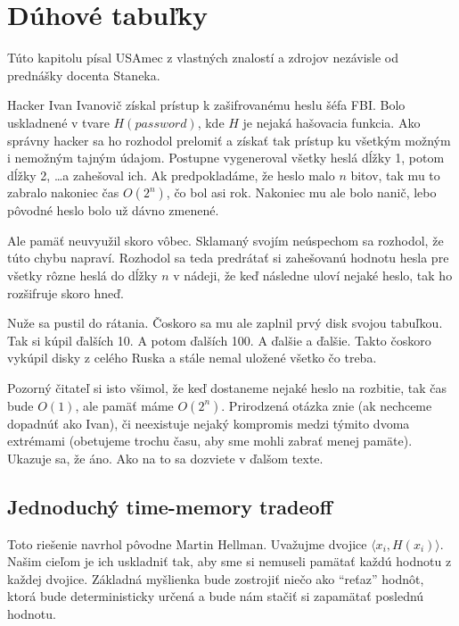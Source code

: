 \section{Dúhové tabuľky}

\begin{poznamka}
    Túto kapitolu písal USAmec z vlastných znalostí a zdrojov
    nezávisle od prednášky docenta Staneka.
\end{poznamka}

Hacker Ivan Ivanovič získal prístup k zašifrovanému heslu šéfa FBI.
Bolo uskladnené v tvare $H(password)$, kde $H$ je nejaká hašovacia funkcia.
Ako správny hacker sa ho rozhodol prelomiť a získať tak prístup
ku všetkým možným i nemožným tajným údajom.
Postupne vygeneroval všetky heslá dĺžky 1, potom dĺžky 2, \dots a
zahešoval ich.
Ak predpokladáme, že heslo malo $n$ bitov,
tak mu to zabralo nakoniec čas $O(2^n)$,
čo bol asi rok. Nakoniec mu ale bolo nanič, lebo pôvodné heslo bolo už
dávno zmenené.

Ale pamäť neuvyužil skoro vôbec.
Sklamaný svojím neúspechom sa rozhodol, že túto chybu napraví.
Rozhodol sa teda predrátať si zahešovanú hodnotu hesla
pre všetky rôzne heslá do dĺžky $n$ v nádeji,
že keď následne uloví nejaké heslo, tak ho rozšifruje skoro hneď.

Nuže sa pustil do rátania. Čoskoro sa mu ale zaplnil prvý disk svojou tabuľkou.
Tak si kúpil ďalších 10. A potom ďalších 100. A ďalšie a ďalšie.
Takto čoskoro vykúpil disky z celého Ruska
a stále nemal uložené všetko čo treba.

Pozorný čitateľ si isto všimol, že keď dostaneme nejaké heslo na rozbitie,
tak čas bude $O(1)$, ale pamäť máme $O(2^n)$.
Prirodzená otázka znie (ak nechceme dopadnúť ako Ivan),
či neexistuje nejaký kompromis medzi týmito dvoma extrémami
(obetujeme trochu času, aby sme mohli zabrať menej pamäte).
Ukazuje sa, že áno. Ako na to sa dozviete v ďalšom texte.

\subsection{Jednoduchý time-memory tradeoff}

Toto riešenie navrhol pôvodne Martin Hellman.
Uvažujme dvojice $\langle x_i, H(x_i) \rangle$.
Našim cieľom je ich uskladniť tak, aby sme si nemuseli
pamätať každú hodnotu z každej dvojice. 
Základná myšlienka bude zostrojiť niečo ako ``reťaz'' hodnôt, ktorá
bude deterministicky určená a bude nám stačiť si zapamätať poslednú
hodnotu.

